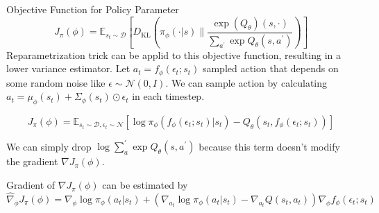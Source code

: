 \documentclass[8pt]{beamer}
\begin{document}
\begin{frame}{Objective Function for Policy Parameter}
    \[
        J_\pi (\phi) = \mathbb{E}_{s_t \sim \mathcal{D}}\left[D_\text{KL} \left( \pi_\phi (\cdot | s) \parallel \frac{\exp{(Q_\theta)}(s, \cdot)}{\sum_{a^\prime} \exp{Q_\theta (s, a^\prime)}} \right)\right]
    \]
Reparametrization trick can be applid to this objective function, resulting in a lower variance estimator. Let $a_t = f_\phi (\epsilon_t; s_t)$ sampled action that depends on some random noise like $\epsilon \sim \mathcal{N}(0, I)$. We can sample action by calculating $a_t = \mu_\phi(s_t) + \Sigma_\phi(s_t) \odot \epsilon_t$ in each timestep.


\[
    J_\pi (\phi) = \mathbb{E}_{s_t \sim \mathcal{D}, \epsilon_t \sim \mathcal{N}}[ \log{\pi_\phi}(f_\phi (\epsilon_t ; s_t)|s_t) - Q_\theta (s_t, f_\phi (\epsilon_t; s_t))]
\]

We can simply drop $\log{\sum_a^\prime \exp{Q_\theta(s,a^\prime)}}$ because this term doesn't modify the gradient $\nabla J_\pi (\phi)$.

Gradient of $\nabla J_\pi (\phi)$ can be estimated by
\[
    \hat{\nabla}_\phi J_\pi (\phi) = \nabla_\phi \log{\pi_\phi (a_t| s_t)} + (\nabla_{a_t} \log{\pi_\phi}(a_t | s_t) - \nabla_{a_t}Q(s_t,a_t))\nabla_\phi f_\phi (\epsilon_t ; s_t)
\]
\end{frame}
\end{document}
